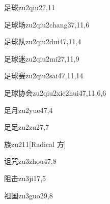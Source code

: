 \begin{verbete}{足球}{zu2qiu2}{7,11}
\end{verbete}

\begin{verbete}{足球场}{zu2qiu2chang3}{7,11,6}
\end{verbete}

\begin{verbete}{足球队}{zu2qiu2dui4}{7,11,4}
\end{verbete}

\begin{verbete}{足球迷}{zu2qiu2mi2}{7,11,9}
\end{verbete}

\begin{verbete}{足球赛}{zu2qiu2sai4}{7,11,14}
\end{verbete}

\begin{verbete}{足球协会}{zu2qiu2xie2hui4}{7,11,6,6}
\end{verbete}

\begin{verbete}{足月}{zu2yue4}{7,4}
\end{verbete}

\begin{verbete}{足足}{zu2zu2}{7,7}
\end{verbete}

\begin{verbete}{族}{zu2}{11}[Radical 方]
\end{verbete}

\begin{verbete}{诅咒}{zu3zhou4}{7,8}
\end{verbete}

\begin{verbete}{阻击}{zu3ji1}{7,5}
\end{verbete}

\begin{verbete}{祖国}{zu3guo2}{9,8}
\end{verbete}

